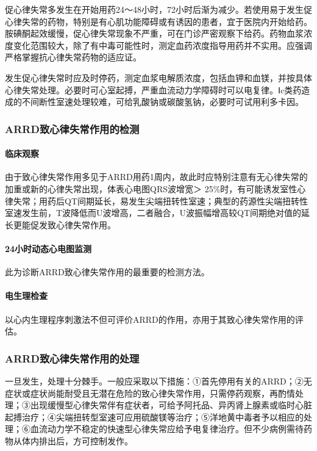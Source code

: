 促心律失常多发生在开始用药24～48小时，72小时后渐为减少。若使用易于发生促心律失常的药物，特别是有心肌功能障碍或有诱因的患者，宜于医院内开始给药。胺碘酮起效缓慢，促心律失常现象不严重，可在门诊严密观察下给药。药物血浆浓度变化范围较大，除了有中毒可能性时，测定血药浓度指导用药并不实用。应强调严格掌握抗心律失常药物的适应证。

发生促心律失常时应及时停药，测定血浆电解质浓度，包括血钾和血镁，并按具体心律失常处理。必要时可心室起搏，严重血流动力学障碍时可以电复律。Ⅰc类药造成的不间断性室速处理较难，可给乳酸钠或碳酸氢钠，必要时可试用利多卡因。

\subsubsection{ARRD致心律失常作用的检测}

\paragraph{临床观察}

由于致心律失常作用多见于ARRD用药1周内，故此时应特别注意有无心律失常的加重或新的心律失常出现，体表心电图QRS波增宽＞
25\%时，有可能诱发室性心律失常；用药后QT间期延长，易发生尖端扭转性室速；典型的药源性尖端扭转性室速发生前，T波降低而U波增高，二者融合，U波振幅增高较QT间期绝对值的延长更能促发致心律失常作用。

\paragraph{24小时动态心电图监测}

此为诊断ARRD致心律失常作用的最重要的检测方法。

\paragraph{电生理检查}

以心内生理程序刺激法不但可评价ARRD的作用，亦用于其致心律失常作用的评估。

\subsubsection{ARRD致心律失常作用的处理}

一旦发生，处理十分棘手。一般应采取以下措施：①首先停用有关的ARRD；②无症状或症状尚能耐受且无潜在危险的致心律失常作用，只需停药观察，再酌情处理；③出现缓慢型心律失常伴有症状者，可给予阿托品、异丙肾上腺素或临时心脏起搏治疗；④尖端扭转型室速可应用硫酸镁等治疗；⑤洋地黄中毒者予以相应的处理；⑥血流动力学不稳定的快速型心律失常应给予电复律治疗。但不少病例需待药物从体内排出后，方可控制发作。

